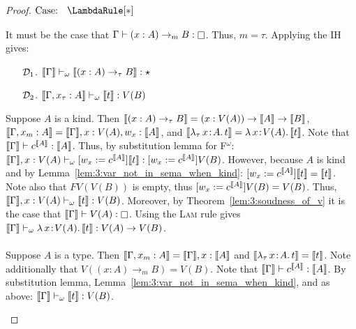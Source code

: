 \begin{proof}
    $\text{Case: }\begin{array}{c} \LambdaRule[*] \end{array}$
    \begin{proofcase}
        It must be the case that $\Gamma \vdash (x : A) \to_m B : \kind$.
        Thus, $m = \tau$.
        Applying the IH gives:
        \begin{enumerate}
            \item[$\mathcal{D}_{1}$.] $\llbracket \Gamma \rrbracket \vdash_\omega \llbracket (x : A) \to_\tau B \rrbracket : \star$
            \item[$\mathcal{D}_{2}$.] $\llbracket \Gamma, x_\tau : A \rrbracket \vdash_\omega \llbracket t \rrbracket : V(B)$ 
        \end{enumerate}
        Suppose $A$ is a kind.
        Then $\llbracket (x : A) \to_\tau B \rrbracket = (x : V(A)) \to \llbracket A \rrbracket \to \llbracket B \rrbracket$, $\llbracket \Gamma, x_m : A \rrbracket = \llbracket \Gamma \rrbracket, x : V(A), w_x : \llbracket A \rrbracket$, and $\llbracket {\lambda_\tau}\, x\! : \! A.\, t \rrbracket = {\lambda}\, x\! : \! V(A).\, \llbracket t \rrbracket$.
        Note that $\llbracket \Gamma \rrbracket \vdash c^{\llbracket A \rrbracket} : \llbracket A \rrbracket$.
        Thus, by substitution lemma for F$^\omega$: $\llbracket \Gamma \rrbracket, x : V(A) \vdash_\omega [w_x := c^{\llbracket A \rrbracket}]\llbracket t \rrbracket : [w_x := c^{\llbracket A \rrbracket}]V(B)$.
        However, because $A$ is kind and by Lemma~\ref{lem:3:var_not_in_sema_when_kind}: $[w_x := c^{\llbracket A \rrbracket}]\llbracket t \rrbracket = \llbracket t \rrbracket$.
        Note also that $FV(V(B))$ is empty, thus $[w_x := c^{\llbracket A \rrbracket}]V(B) = V(B)$.
        Thus, $\llbracket \Gamma \rrbracket, x : V(A) \vdash_\omega \llbracket t \rrbracket : V(B)$.
        Moreover, by Theorem~\ref{lem:3:soudness_of_v} it is the case that $\sema{\Gamma} \vdash V(A) : \kind$.
        Using the \textsc{Lam} rule gives $\llbracket \Gamma \rrbracket \vdash_\omega {\lambda}\, x\! : \! V(A).\, \llbracket t \rrbracket : V(A) \to V(B)$.
        \\ \\
        Suppose $A$ is a type.
        Then $\llbracket \Gamma, x_m : A \rrbracket = \llbracket \Gamma \rrbracket, x : \llbracket A \rrbracket$ and $\llbracket {\lambda_\tau}\, x\! : \! A.\, t \rrbracket = \llbracket t \rrbracket$.
        Note additionally that $V((x : A) \to_m B) = V(B)$.
        Note that $\llbracket \Gamma \rrbracket \vdash c^{\llbracket A \rrbracket} : \llbracket A \rrbracket$.
        By substitution lemma, Lemma~\ref{lem:3:var_not_in_sema_when_kind}, and as above: $\llbracket \Gamma \rrbracket \vdash_\omega \llbracket t \rrbracket : V(B)$.
    \end{proofcase}


\end{proof}
